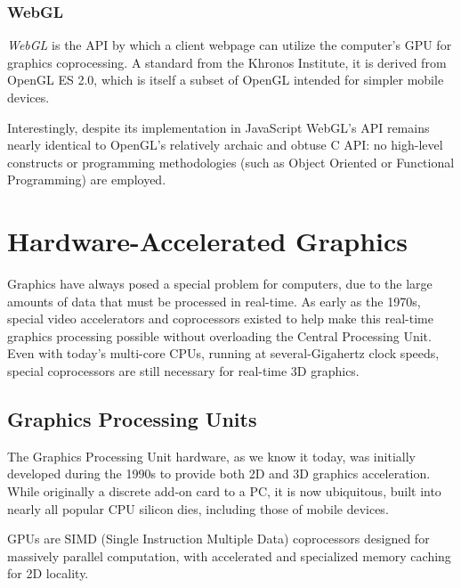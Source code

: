 \subsubsection{WebGL}
\emph{WebGL} is the API by which a client webpage can utilize the computer's GPU for graphics coprocessing. A standard from the Khronos Institute, it is derived from OpenGL ES 2.0, which is itself a subset of OpenGL intended for simpler mobile devices. \par
Interestingly, despite its implementation in JavaScript WebGL's API remains nearly identical to OpenGL's relatively archaic and obtuse C API: no high-level constructs or programming methodologies (such as Object Oriented or Functional Programming) are employed.



\section{Hardware-Accelerated Graphics}
Graphics have always posed a special problem for computers, due to the large amounts of data that must be processed in real-time. As early as the 1970s, special video accelerators and coprocessors existed to help make this real-time graphics processing possible without overloading the Central Processing Unit. Even with today's multi-core CPUs, running at several-Gigahertz clock speeds, special coprocessors are still necessary for real-time 3D graphics.

\subsection{Graphics Processing Units}
The Graphics Processing Unit hardware, as we know it today, was initially developed during the 1990s to provide both 2D and 3D graphics acceleration. While originally a discrete add-on card to a PC, it is now ubiquitous, built into nearly all popular CPU silicon dies, including those of mobile devices.
\par GPUs are SIMD (Single Instruction Multiple Data) coprocessors designed for massively parallel computation, with accelerated and specialized memory caching for 2D locality.

